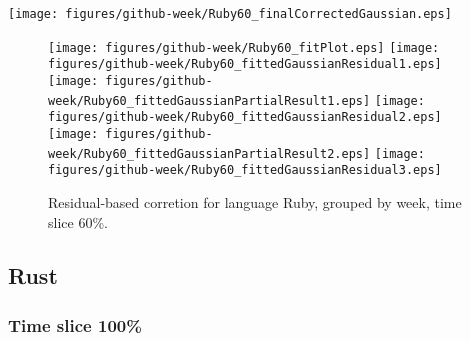 \begin{center}
{\texttt{[image: figures/github-week/Ruby60\_finalCorrectedGaussian.eps]}}
\end{center}

\FloatBarrier

\begin{figure}[t]
\centering
{}
{\texttt{[image: figures/github-week/Ruby60\_fitPlot.eps]}}
{\texttt{[image: figures/github-week/Ruby60\_fittedGaussianResidual1.eps]}}
{\texttt{[image: figures/github-week/Ruby60\_fittedGaussianPartialResult1.eps]}}
{\texttt{[image: figures/github-week/Ruby60\_fittedGaussianResidual2.eps]}}
{\texttt{[image: figures/github-week/Ruby60\_fittedGaussianPartialResult2.eps]}}
{\texttt{[image: figures/github-week/Ruby60\_fittedGaussianResidual3.eps]}}
\caption{Residual-based corretion for language Ruby, grouped by week, time slice 60\%.}
\end{figure}


\FloatBarrier


\subsection{Rust}

\subsubsection{Time slice 100\%}

